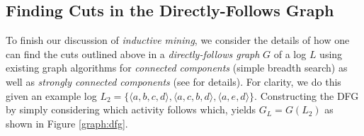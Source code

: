 \documentclass[a4paper]{IEEEtran}
\begin{document}
\subsection{Finding Cuts in the Directly-Follows Graph}
To finish our discussion of \textit{inductive mining}, we consider the details of how one can find the cuts outlined above in a \textit{directly-follows graph} $G$ of a log $L$ using existing graph algorithms for \textit{connected components} (simple breadth search) as well as \textit{strongly connected components} (see \cite{tarjan1972depth} for details). For clarity, we do this given an example log $L_2 = \{ \langle a,b,c,d \rangle, \langle a,c,b,d \rangle, \langle a,e,d \rangle \}$. Constructing the DFG by simply considering which activity follows which, yields $G_L = G(L_2)$ as shown in Figure \ref{graph:dfg}.
\end{document}
